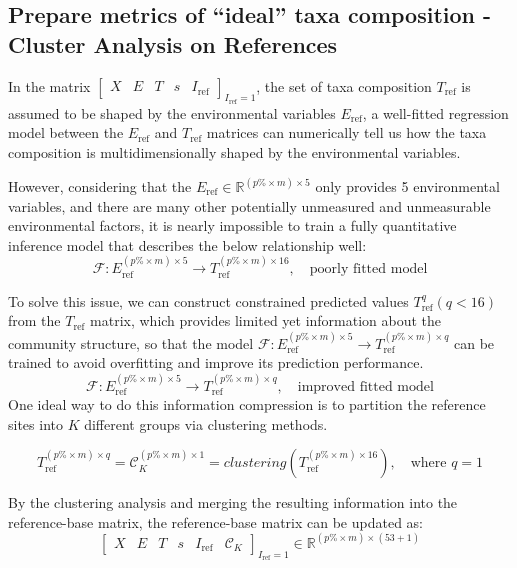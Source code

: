 \subsection{Prepare metrics of “ideal” taxa composition - Cluster Analysis on References}
In the matrix
$\left[
\begin{array}{ccccc}
X & E & T & s & I_{\text{ref}} 
\end{array}
\right]_{I_{\text{ref}} = 1}
$, the set of taxa composition \(T_{\text{ref}}\) 
is assumed to be shaped by the environmental variables \(E_{\text{ref}}\),
a well-fitted regression model between the \(E_{\text{ref}}\) and \(T_{\text{ref}}\)
matrices can numerically tell us how the taxa composition is multidimensionally shaped by the environmental variables.

However, considering that the \(E_{\text{ref}} \in \mathbb{R}^{(p\% \times m) \times 5}\) only provides 5 environmental variables,
and there are many other potentially unmeasured and unmeasurable environmental factors, it is nearly impossible to train a fully quantitative
inference model that describes the below relationship well:
\[
\mathcal{F} : E_{\text{ref}}^{(p\% \times m) \times 5} \to T_{\text{ref}}^{(p\% \times m) \times 16}, \quad \text{poorly fitted model}
\]

To solve this issue, we can construct constrained predicted values \(T_{\text{ref}}^{q} (q < 16)\) from the \(T_{\text{ref}}\) matrix, which 
provides limited yet information about the community structure, so that the model $\mathcal{F} : E_{\text{ref}}^{(p\% \times m) \times 5} \to T_{\text{ref}}^{(p\% \times m) \times q}$
can be trained to avoid overfitting and improve its prediction performance.
\[
\mathcal{F} : E_{\text{ref}}^{(p\% \times m) \times 5} \to T_{\text{ref}}^{(p\% \times m) \times q}, \quad \text{improved fitted model}
\]
One ideal way to do this information compression is 
to partition the reference sites into \(K\) different groups via clustering methods.

\[
T_{\text{ref}}^{(p\% \times m) \times q} = \mathcal{C}_K^{(p\% \times m) \times 1}  = clustering(T_{\text{ref}}^{(p\% \times m) \times 16}), \quad \text{where } q = 1
\]

By the clustering analysis and merging the resulting information into the reference-base matrix, the reference-base matrix can be updated as:
\[
\left[
\begin{array}{cccccc}
X & E & T & s & I_{\text{ref}} & \mathcal{C}_K
\end{array}
\right]_{I_{\text{ref}} = 1}
\in
\mathbb{R}^{(p\% \times m) \times (53 + 1)}
\]


